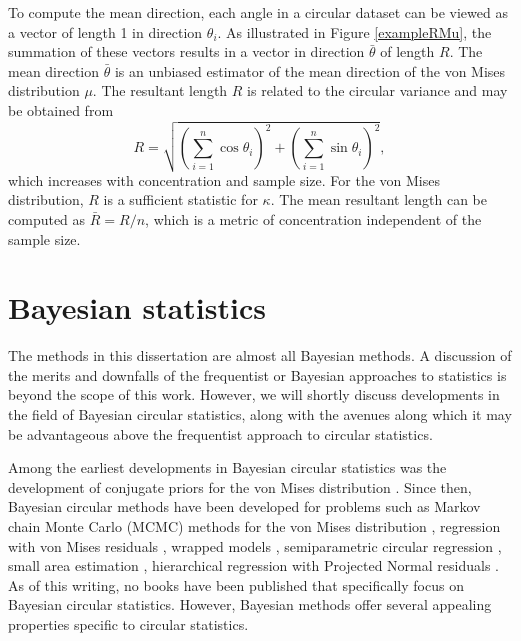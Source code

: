 \documentclass[12pt, a4paper]{book}\usepackage[]{graphicx}\usepackage[]{color}
\begin{document}
To compute the mean direction, each angle in a circular dataset can be viewed as a vector of length 1 in direction $\theta_i$. As illustrated in Figure \ref{exampleRMu}, the summation of these vectors results in a vector in direction $\bar{\theta}$ of length $R$. The mean direction $\bar{\theta}$ is an unbiased estimator of the mean direction of the von Mises distribution $\mu$. The resultant length $R$ is related to the circular variance and may be obtained from
$$ R = \sqrt{\left(\sum_{i=1}^{n} \cos \theta_i \right)^2 + \left(\sum_{i=1}^{n} \sin \theta_i \right)^2},$$
which increases with concentration and sample size. For the von Mises distribution, $R$ is a sufficient statistic for $\kappa$. The mean resultant length can be computed as $\bar{R} = R/n$, which is a metric of concentration independent of the sample size.





\section{Bayesian statistics}

The methods in this dissertation are almost all Bayesian methods. A discussion of the merits and downfalls of the frequentist or Bayesian approaches to statistics is beyond the scope of this work. However, we will shortly discuss developments in the field of Bayesian circular statistics, along with the avenues along which it may be advantageous above the frequentist approach to circular statistics.

Among the earliest developments in Bayesian circular statistics was the development of conjugate priors for the von Mises distribution \citep{mardia1976bayesian}. Since then, Bayesian circular methods have been developed for problems such as Markov chain Monte Carlo (MCMC) methods for the von Mises distribution \citep{damien1999fullbayes, forbes2015fast}, regression with von Mises residuals \citep{gill2010}, wrapped models \citep{ravindran2011bayesian}, semiparametric circular regression \citep{george2006semiparametric, mcvinish2008semiparametric, Bhattacharya2009}, small area estimation \citep{hernandez2016hierarchical}, hierarchical regression with Projected Normal residuals \citep{nunez2011bayesian, nunez2014bayesian}. As of this writing, no books have been published that specifically focus on Bayesian circular statistics. However, Bayesian methods offer several appealing properties specific to circular statistics.
\end{document}
